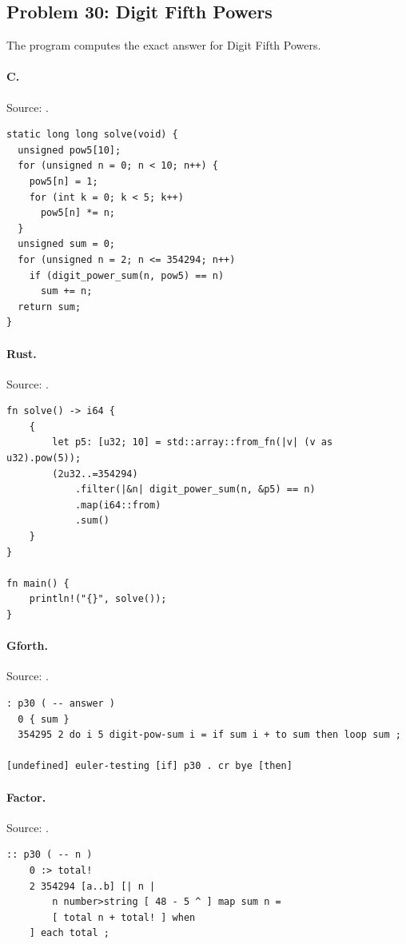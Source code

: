 \subsection{Problem 30: Digit Fifth Powers}
\label{walkthrough:p30}
The program computes the exact answer for Digit Fifth Powers.

\paragraph{C.} Source: .
\begin{lstlisting}
static long long solve(void) {
  unsigned pow5[10];
  for (unsigned n = 0; n < 10; n++) {
    pow5[n] = 1;
    for (int k = 0; k < 5; k++)
      pow5[n] *= n;
  }
  unsigned sum = 0;
  for (unsigned n = 2; n <= 354294; n++)
    if (digit_power_sum(n, pow5) == n)
      sum += n;
  return sum;
}
\end{lstlisting}

\paragraph{Rust.} Source: .
\begin{lstlisting}
fn solve() -> i64 {
    {
        let p5: [u32; 10] = std::array::from_fn(|v| (v as u32).pow(5));
        (2u32..=354294)
            .filter(|&n| digit_power_sum(n, &p5) == n)
            .map(i64::from)
            .sum()
    }
}

fn main() {
    println!("{}", solve());
}
\end{lstlisting}

\paragraph{Gforth.} Source: .
\begin{lstlisting}
: p30 ( -- answer )
  0 { sum }
  354295 2 do i 5 digit-pow-sum i = if sum i + to sum then loop sum ;

[undefined] euler-testing [if] p30 . cr bye [then]
\end{lstlisting}

\paragraph{Factor.} Source: .
\begin{lstlisting}
:: p30 ( -- n )
    0 :> total!
    2 354294 [a..b] [| n |
        n number>string [ 48 - 5 ^ ] map sum n =
        [ total n + total! ] when
    ] each total ;
\end{lstlisting}

